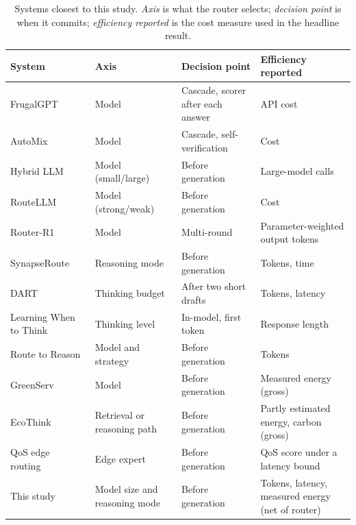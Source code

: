 \begin{table}[!t]
\centering
\caption{Systems closest to this study. \emph{Axis} is what the router
selects; \emph{decision point} is when it commits; \emph{efficiency
reported} is the cost measure used in the headline result.}
\label{tab:prior-work}
\renewcommand{\arraystretch}{1.15}
\begin{tabularx}{\textwidth}{@{}l l >{\raggedright\arraybackslash}X >{\raggedright\arraybackslash}X@{}}
\toprule
System & Axis & Decision point & Efficiency reported \\
\midrule
FrugalGPT~\cite{chen2023frugalgpt} & Model & Cascade, scorer after each answer & API cost \\
AutoMix~\cite{aggarwal2024automix} & Model & Cascade, self-verification & Cost \\
Hybrid LLM~\cite{ding2024hybridllm} & Model (small/large) & Before generation & Large-model calls \\
RouteLLM~\cite{ong2024routellm} & Model (strong/weak) & Before generation & Cost \\
Router-R1~\cite{zhang2025routerr1} & Model & Multi-round & Parameter-weighted output tokens \\
SynapseRoute~\cite{zhang2025synapseroute} & Reasoning mode & Before generation & Tokens, time \\
DART~\cite{lee2026dart} & Thinking budget & After two short drafts & Tokens, latency \\
Learning When to Think~\cite{kassenaar2026learningwhentothink} & Thinking level & In-model, first token & Response length \\
Route to Reason~\cite{pan2026routetoreason} & Model and strategy & Before generation & Tokens \\
GreenServ~\cite{ziller2026greenserv} & Model & Before generation & Measured energy (gross) \\
EcoThink~\cite{li2026ecothink} & Retrieval or reasoning path & Before generation & Partly estimated energy, carbon (gross) \\
QoS edge routing~\cite{yang2025qosrouting} & Edge expert & Before generation & QoS score under a latency bound \\
\midrule
This study & Model size and reasoning mode & Before generation & Tokens, latency, measured energy (net of router) \\
\bottomrule
\end{tabularx}
\end{table}
